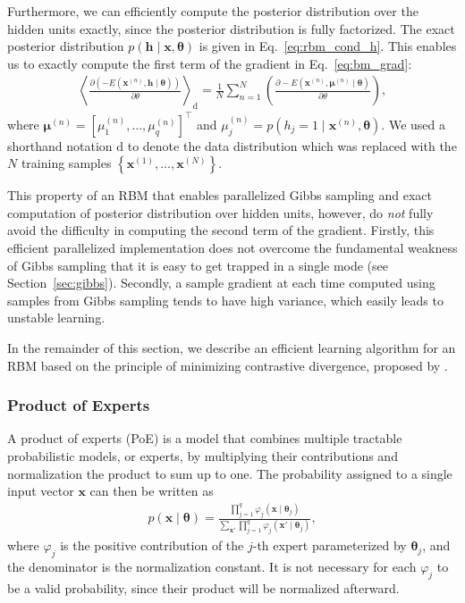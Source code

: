 \documentclass{now}
\newcommand{\vect}[1]{\mathbf{#1}}
\newcommand{\vects}[1]{\boldsymbol{#1}}
\newcommand{\vh}[0]{\vect{h}}
\newcommand{\vx}[0]{\vect{x}}
\newcommand{\td}[0]{\text{d}}
\newcommand{\vmu}[0]{\vects{\mu}}
\newcommand{\TT}[0]{{\vects{\theta}}}
\begin{document}
Furthermore, %
we can efficiently
compute the posterior distribution over the hidden units
exactly, since the posterior distribution is fully
factorized. The exact posterior distribution ${p(\vh \mid
\vx, \TT)}$ is given in Eq.~\eqref{eq:rbm_cond_h}. This
enables us to exactly compute the first term of the
gradient in Eq.~\eqref{eq:bm_grad}:
\begin{align}
    \label{eq:rbm_grad}
    \left< \frac{\partial
    \left(-E(\vx^{(n)}, \vh\mid\TT)\right)}{\partial \theta}
    \right>_{\td} = 
    \frac{1}{N} \sum_{n=1}^N \left( \frac{\partial
    -E(\vx^{(n)}, \vmu^{(n)} \mid \TT)}{\partial \theta}
    \right),
\end{align}
where $\vmu^{(n)} = \left[ \mu_1^{(n)}, \dots, \mu_q^{(n)}
\right]^\top$ and $\mu_j^{(n)} = p(h_j=1 \mid \vx^{(n)},
\TT)$. We used a shorthand notation $\td$ to denote the data
distribution which was replaced with the $N$
training samples $\left\{ \vx^{(1)}, \dots,
\vx^{(N)}\right\}$. 

This property of an RBM that enables parallelized
Gibbs sampling and exact computation of posterior
distribution over hidden units, however, do \textit{not} fully avoid
the difficulty in computing the second term of the gradient.
Firstly, this efficient parallelized implementation does not
overcome the fundamental weakness of Gibbs sampling that it
is easy to get trapped in a single mode (see
Section~\ref{sec:gibbs}). Secondly, a sample gradient at
each time computed using samples from Gibbs sampling tends
to have high variance, which easily leads to unstable
learning.

In the remainder of this section, we describe an efficient
learning algorithm for an RBM based on the principle of
minimizing contrastive divergence, proposed by
\citet{Hinton2002}. 



\subsubsection{Product of Experts}
\label{sec:poe}

A product of experts (PoE) \citep{Hinton2002} is a model that
combines multiple tractable probabilistic models, or
experts, by multiplying their contributions and
normalization
the product to sum up to one. The probability assigned to a
single input vector $\vx$ can then be written as
\begin{align}
    \label{eq:poe}
    p(\vx \mid \TT) = \frac{\prod_{j=1}^q \varphi_j(\vx \mid
    \TT_j)}{\sum_{\vx'} \prod_{j=1}^q \varphi_j(\vx' \mid
    \TT_j)},
\end{align}
where $\varphi_j$ is the positive contribution of the $j$-th
expert parameterized by $\TT_j$, and the denominator is the
normalization constant. It is not necessary for each
$\varphi_j$ to be a valid probability, since their product
will be normalized afterward.
\end{document}
